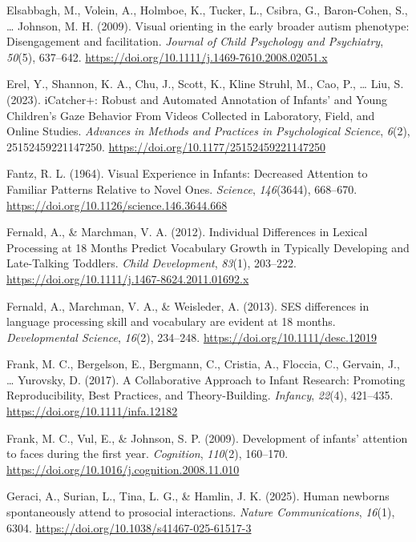 \documentclass[
  english,
  man,floatsintext]{apa6}
\newlength{\cslhangindent}
\newenvironment{CSLReferences}[2] %
 {\begin{list}{}{%
  \setlength{\itemindent}{0pt}
  \setlength{\leftmargin}{0pt}
  \setlength{\parsep}{0pt}
  \ifodd #1
   \setlength{\leftmargin}{\cslhangindent}
   \setlength{\itemindent}{-1\cslhangindent}
  \fi
  \setlength{\itemsep}{#2\baselineskip}}}
 {\end{list}}
\begin{document}
\begin{CSLReferences}{1}{0}
Elsabbagh, M., Volein, A., Holmboe, K., Tucker, L., Csibra, G., Baron-Cohen, S., \ldots{} Johnson, M. H. (2009). Visual orienting in the early broader autism phenotype: Disengagement and facilitation. \emph{Journal of Child Psychology and Psychiatry}, \emph{50}(5), 637--642. \url{https://doi.org/10.1111/j.1469-7610.2008.02051.x}

Erel, Y., Shannon, K. A., Chu, J., Scott, K., Kline Struhl, M., Cao, P., \ldots{} Liu, S. (2023). {iCatcher}+: {Robust} and {Automated Annotation} of {Infants}' and {Young Children}'s {Gaze Behavior From Videos Collected} in {Laboratory}, {Field}, and {Online Studies}. \emph{Advances in Methods and Practices in Psychological Science}, \emph{6}(2), 25152459221147250. \url{https://doi.org/10.1177/25152459221147250}

Fantz, R. L. (1964). Visual {Experience} in {Infants}: {Decreased Attention} to {Familiar Patterns Relative} to {Novel Ones}. \emph{Science}, \emph{146}(3644), 668--670. \url{https://doi.org/10.1126/science.146.3644.668}

Fernald, A., \& Marchman, V. A. (2012). Individual {Differences} in {Lexical Processing} at 18 {Months Predict Vocabulary Growth} in {Typically Developing} and {Late-Talking Toddlers}. \emph{Child Development}, \emph{83}(1), 203--222. \url{https://doi.org/10.1111/j.1467-8624.2011.01692.x}

Fernald, A., Marchman, V. A., \& Weisleder, A. (2013). {SES} differences in language processing skill and vocabulary are evident at 18 months. \emph{Developmental Science}, \emph{16}(2), 234--248. \url{https://doi.org/10.1111/desc.12019}

Frank, M. C., Bergelson, E., Bergmann, C., Cristia, A., Floccia, C., Gervain, J., \ldots{} Yurovsky, D. (2017). A {Collaborative Approach} to {Infant Research}: {Promoting Reproducibility}, {Best Practices}, and {Theory-Building}. \emph{Infancy}, \emph{22}(4), 421--435. \url{https://doi.org/10.1111/infa.12182}

Frank, M. C., Vul, E., \& Johnson, S. P. (2009). Development of infants' attention to faces during the first year. \emph{Cognition}, \emph{110}(2), 160--170. \url{https://doi.org/10.1016/j.cognition.2008.11.010}

Geraci, A., Surian, L., Tina, L. G., \& Hamlin, J. K. (2025). Human newborns spontaneously attend to prosocial interactions. \emph{Nature Communications}, \emph{16}(1), 6304. \url{https://doi.org/10.1038/s41467-025-61517-3}


\end{CSLReferences}
\end{document}

